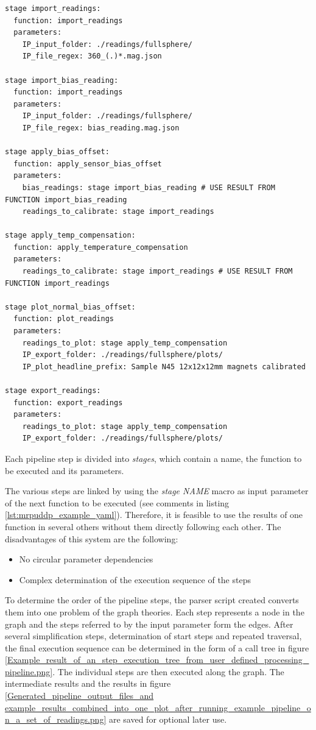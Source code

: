 \begin{lstlisting}[caption={Example YAML code of a user defined processing pipeline with six stages linked together}, label=lst:mrpuddp_example_yaml]
stage import_readings:
  function: import_readings
  parameters:
    IP_input_folder: ./readings/fullsphere/
    IP_file_regex: 360_(.)*.mag.json

stage import_bias_reading:
  function: import_readings
  parameters:
    IP_input_folder: ./readings/fullsphere/
    IP_file_regex: bias_reading.mag.json

stage apply_bias_offset:
  function: apply_sensor_bias_offset
  parameters:
    bias_readings: stage import_bias_reading # USE RESULT FROM FUNCTION import_bias_reading
    readings_to_calibrate: stage import_readings

stage apply_temp_compensation:
  function: apply_temperature_compensation
  parameters:
    readings_to_calibrate: stage import_readings # USE RESULT FROM FUNCTION import_readings

stage plot_normal_bias_offset:
  function: plot_readings
  parameters:
    readings_to_plot: stage apply_temp_compensation
    IP_export_folder: ./readings/fullsphere/plots/
    IP_plot_headline_prefix: Sample N45 12x12x12mm magnets calibrated

stage export_readings:
  function: export_readings
  parameters:
    readings_to_plot: stage apply_temp_compensation
    IP_export_folder: ./readings/fullsphere/plots/
\end{lstlisting}

\newpage

Each pipeline step is divided into \emph{stages}, which contain a name,
the function to be executed and its parameters.

The various steps are linked by using the \emph{stage NAME} macro as
input parameter of the next function to be executed (see comments in
listing \ref{lst:mrpuddp_example_yaml}). Therefore, it is feasible to
use the results of one function in several others without them directly
following each other. The disadvantages of this system are the
following:

\begin{itemize}
\tightlist
\item
  No circular parameter dependencies
\item
  Complex determination of the execution sequence of the steps
\end{itemize}

To determine the order of the pipeline steps, the parser script created
converts them into one problem of the graph theories. Each step
represents a node in the graph and the steps referred to by the input
parameter form the edges. After several simplification steps,
determination of start steps and repeated traversal, the final execution
sequence can be determined in the form of a call tree in figure
\ref{Example_result_of_an_step_execution_tree_from_user_defined_processing_pipeline.png}.
The individual steps are then executed along the graph. The intermediate
results and the results in figure
\ref{Generated_pipeline_output_files_and example_results_combined_into_one_plot_after_running_example_pipeline_on_a_set_of_readings.png}
are saved for optional later use.

